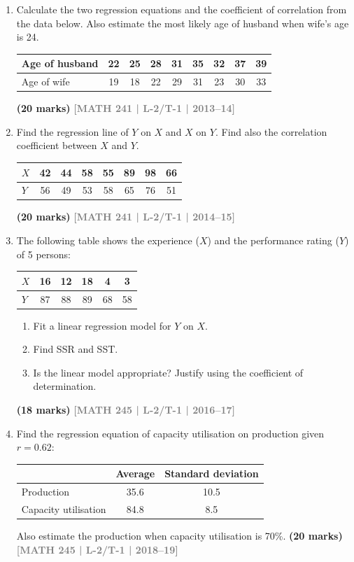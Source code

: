 \documentclass[12pt,a4paper]{article}
\newcommand{\yr}[1]{\hfill\textcolor{gray}{\small\textbf{[#1]}}}
\newcommand{\mk}[1]{\textcolor{orange!70!black}{\small\textbf{(#1 marks)}}}
\begin{document}
\begin{enumerate}
\item Calculate the two regression equations and the coefficient of correlation from the data below. Also estimate the most likely age of husband when wife's age is 24.
\begin{center}
\begin{tabular}{lcccccccc}
\toprule
Age of husband & 22 & 25 & 28 & 31 & 35 & 32 & 37 & 39 \\
\midrule
Age of wife    & 19 & 18 & 22 & 29 & 31 & 23 & 30 & 33 \\
\bottomrule
\end{tabular}
\end{center}
\mk{20} \yr{MATH 241 | L-2/T-1 | 2013--14}

\item Find the regression line of $Y$ on $X$ and $X$ on $Y$. Find also the correlation coefficient between $X$ and $Y$.
\begin{center}
\begin{tabular}{lccccccc}
\toprule
$X$ & 42 & 44 & 58 & 55 & 89 & 98 & 66 \\
\midrule
$Y$ & 56 & 49 & 53 & 58 & 65 & 76 & 51 \\
\bottomrule
\end{tabular}
\end{center}
\mk{20} \yr{MATH 241 | L-2/T-1 | 2014--15}

\item The following table shows the experience ($X$) and the performance rating ($Y$) of 5 persons:
\begin{center}
\begin{tabular}{lccccc}
\toprule
$X$ & 16 & 12 & 18 & 4 & 3 \\
\midrule
$Y$ & 87 & 88 & 89 & 68 & 58 \\
\bottomrule
\end{tabular}
\end{center}
\begin{enumerate}
  \item Fit a linear regression model for $Y$ on $X$.
  \item Find SSR and SST.
  \item Is the linear model appropriate? Justify using the coefficient of determination.
\end{enumerate}
\mk{18} \yr{MATH 245 | L-2/T-1 | 2016--17}

\item Find the regression equation of capacity utilisation on production given $r=0.62$:
\begin{center}
\begin{tabular}{lcc}
\toprule
 & \textbf{Average} & \textbf{Standard deviation} \\
\midrule
Production & 35.6 & 10.5 \\
Capacity utilisation & 84.8 & 8.5 \\
\bottomrule
\end{tabular}
\end{center}
Also estimate the production when capacity utilisation is 70\%.
\mk{20} \yr{MATH 245 | L-2/T-1 | 2018--19}


\end{enumerate}
\end{document}
